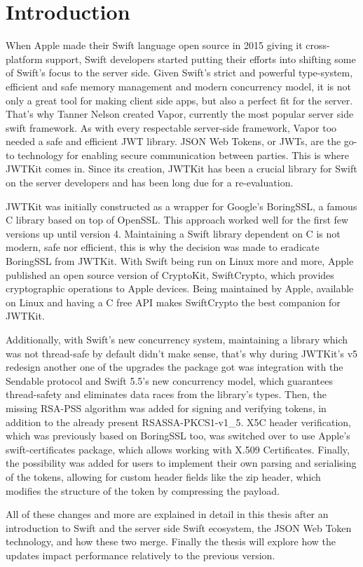 \chapter*{Introduction}

When Apple made their Swift language open source in 2015 giving it cross-platform support, Swift developers started putting their efforts into shifting some of Swift's focus to the server side. 
Given Swift's strict and powerful type-system, efficient and safe memory management and modern concurrency model, it is not only a great tool for making client side apps, but also a perfect fit for the server. That's why Tanner Nelson created Vapor, currently the most popular server side swift framework. As with every respectable server-side framework, Vapor too needed a safe and efficient JWT library. JSON Web Tokens, or JWTs, are the go-to technology for enabling secure communication between parties. This is where JWTKit comes in. Since its creation, JWTKit has been a crucial library for Swift on the server developers and has been long due for a re-evaluation. 

JWTKit was initially constructed as a wrapper for Google's BoringSSL, a famous C library based on top of OpenSSL. This approach worked well for the first few versions up until version 4. Maintaining a Swift library dependent on C is not modern, safe nor efficient, this is why the decision was made to eradicate BoringSSL from JWTKit. With Swift being run on Linux more and more, Apple published an open source version of CryptoKit, SwiftCrypto, which provides cryptographic operations to Apple devices. Being maintained by Apple, available on Linux and having a C free API makes SwiftCrypto the best companion for JWTKit.

Additionally, with Swift's new concurrency system, maintaining a library which was not thread-safe by default didn't make sense, that's why during JWTKit's v5 redesign another one of the upgrades the package got was integration with the Sendable protocol and Swift 5.5's new concurrency model, which guarantees thread-safety and eliminates data races from the library's types. Then, the missing RSA-PSS algorithm was added for signing and verifying tokens, in addition to the already present RSASSA-PKCS1-v1\_5. X5C header verification, which was previously based on BoringSSL too, was switched over to use Apple's swift-certificates package, which allows working with X.509 Certificates. Finally, the possibility was added for users to implement their own parsing and serialising of the tokens, allowing for custom header fields like the zip header, which modifies the structure of the token by compressing the payload.

All of these changes and more are explained in detail in this thesis after an introduction to Swift and the server side Swift ecosystem, the JSON Web Token technology, and how these two merge. Finally the thesis will explore how the updates impact performance relatively to the previous version.